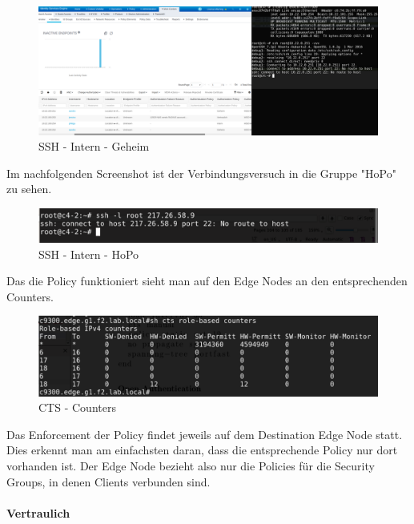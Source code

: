 \begin{figure}[H]
	\centering
	\includegraphics[width=16cm]{img/secondtry/ssh-intern-geheim.png}
	\caption{SSH - Intern - Geheim}
	\label{fig:ssh-intern-geheim}
\end{figure}

Im nachfolgenden Screenshot ist der Verbindungsversuch in die Gruppe "HoPo" zu sehen.

\begin{figure}[H]
	\centering
	\includegraphics[width=14cm]{img/secondtry/ssh-intern-hopo.png}
	\caption{SSH - Intern - HoPo}
	\label{fig:ssh-intern-hopo}
\end{figure}

Das die Policy funktioniert sieht man auf den Edge Nodes an den entsprechenden Counters.

\begin{figure}[H]
	\centering
	\includegraphics[width=14cm]{img/secondtry/cts-counters.png}
	\caption{CTS - Counters}
	\label{fig:cts-counters}
\end{figure}

Das Enforcement der Policy findet jeweils auf dem Destination Edge Node statt. Dies erkennt man am einfachsten daran, dass die entsprechende Policy nur dort vorhanden ist. Der Edge Node bezieht also nur die Policies für die Security Groups, in denen Clients verbunden sind.

\paragraph{Vertraulich}

